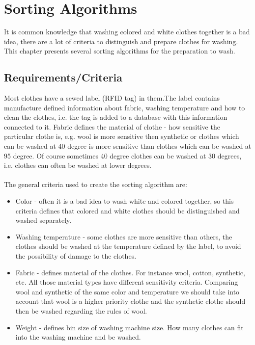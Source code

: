 %
\section{Sorting Algorithms}

It is common knowledge that washing colored and white clothes together is a bad idea, there are a lot of criteria to distinguish and prepare clothes for washing. This chapter presents several sorting algorithms for the preparation to wash. 

\subsection{Requirements/Criteria}

Most clothes have a sewed label (RFID tag) in them.The label contains manufacture defined information about fabric, washing temperature and how to clean the clothes, i.e. the tag is added to a database with this information connected to it. Fabric defines the material of clothe - how sensitive the particular clothe is, e.g. wool is more sensitive then synthetic or clothes which can be washed at 40 degree is more sensitive than clothes which can be washed at 95 degree. Of course sometimes 40 degree clothes can be washed at 30 degrees, i.e. clothes can often be washed at lower degrees. \\ \\ The general criteria used to create the sorting algorithm are:

\begin{itemize}
	\item Color - often it is a bad idea to wash white and colored together, so this criteria defines that colored and white clothes should be distinguished and washed separately. 
	\item Washing temperature - some clothes are more sensitive than others, the clothes should be washed at the temperature defined by the label, to avoid the possibility of damage to the clothes.
	\item Fabric - defines material of the clothes. For instance wool, cotton, synthetic, etc. All those material types have different sensitivity criteria. Comparing wool and synthetic of the same color and temperature we should take into account that wool is a higher priority clothe and the synthetic clothe should then be washed regarding the rules of wool.
	\item Weight - defines bin size of washing machine size. How many clothes can fit into the washing machine and be washed.
\end{itemize}

